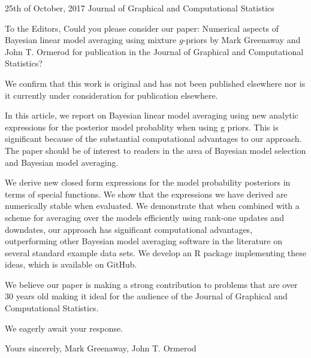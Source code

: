 \documentclass{letter}
\begin{document}
25th of October, 2017
Journal of Graphical and Computational Statistics

To the Editors,
Could you please consider our paper:
Numerical aspects of Bayesian linear model averaging using mixture $g$-priors
by Mark Greenaway and John T. Ormerod
for publication in the Journal of Graphical and Computational Statistics?

We confirm that this work is original and has not been published elsewhere nor is it currently under
consideration for publication elsewhere.

In this article, we report on Bayesian linear model averaging using new analytic expressions for the
posterior model probablity when using g priors. This is significant because of the substantial computational
advantages to our approach. The paper should be of interest to readers in the area of Bayesian model selection
and Bayesian model averaging.

We derive new closed form expressions for the model probability posteriors in terms of special functions.
We show that the expressions we have derived are numerically stable when evaluated. We demonstrate that when 
combined with a scheme for averaging over the models efficiently using rank-one updates and downdates,
our approach has significant computational advantages, outperforming other Bayesian model averaging software
in the literature on several standard example data sets. We develop an R package implementing these ideas,
which is available on GitHub.

We believe our paper is making a strong contribution to problems that are over 30 years old
making it ideal for the audience of the Journal of Graphical and Computational Statistics.

We eagerly await your response.

Yours sincerely,
Mark Greenaway, John T. Ormerod
\end{document}
